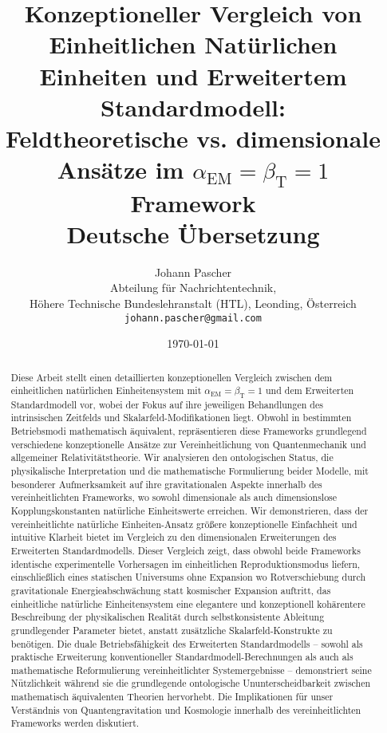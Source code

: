 \documentclass[12pt,a4paper]{article}
\newcommand{\alphaEM}{\alpha_{\text{EM}}}
\newcommand{\betaT}{\beta_{\text{T}}}
\begin{document}
	
	\title{{\Huge Konzeptioneller Vergleich von Einheitlichen Natürlichen Einheiten und Erweitertem Standardmodell:}\\
		{\LARGE Feldtheoretische vs. dimensionale Ansätze im $\alphaEM = \betaT = 1$ Framework}\\
		\vspace{1cm}
		{\large Deutsche Übersetzung}}
	
	\author{{\Large Johann Pascher}\\
		Abteilung für Nachrichtentechnik,\\
		Höhere Technische Bundeslehranstalt (HTL), Leonding, Österreich\\
		\texttt{johann.pascher@gmail.com}}
	
	\date{\today}
	
	\maketitle
	
	\begin{abstract}
		Diese Arbeit stellt einen detaillierten konzeptionellen Vergleich zwischen dem einheitlichen natürlichen Einheitensystem mit $\alphaEM = \betaT = 1$ und dem Erweiterten Standardmodell vor, wobei der Fokus auf ihre jeweiligen Behandlungen des intrinsischen Zeitfelds und Skalarfeld-Modifikationen liegt. Obwohl in bestimmten Betriebsmodi mathematisch äquivalent, repräsentieren diese Frameworks grundlegend verschiedene konzeptionelle Ansätze zur Vereinheitlichung von Quantenmechanik und allgemeiner Relativitätstheorie. Wir analysieren den ontologischen Status, die physikalische Interpretation und die mathematische Formulierung beider Modelle, mit besonderer Aufmerksamkeit auf ihre gravitationalen Aspekte innerhalb des vereinheitlichten Frameworks, wo sowohl dimensionale als auch dimensionslose Kopplungskonstanten natürliche Einheitswerte erreichen. Wir demonstrieren, dass der vereinheitlichte natürliche Einheiten-Ansatz größere konzeptionelle Einfachheit und intuitive Klarheit bietet im Vergleich zu den dimensionalen Erweiterungen des Erweiterten Standardmodells. Dieser Vergleich zeigt, dass obwohl beide Frameworks identische experimentelle Vorhersagen im einheitlichen Reproduktionsmodus liefern, einschließlich eines statischen Universums ohne Expansion wo Rotverschiebung durch gravitationale Energieabschwächung statt kosmischer Expansion auftritt, das einheitliche natürliche Einheitensystem eine elegantere und konzeptionell kohärentere Beschreibung der physikalischen Realität durch selbstkonsistente Ableitung grundlegender Parameter bietet, anstatt zusätzliche Skalarfeld-Konstrukte zu benötigen. Die duale Betriebsfähigkeit des Erweiterten Standardmodells – sowohl als praktische Erweiterung konventioneller Standardmodell-Berechnungen als auch als mathematische Reformulierung vereinheitlichter Systemergebnisse – demonstriert seine Nützlichkeit während sie die grundlegende ontologische Ununterscheidbarkeit zwischen mathematisch äquivalenten Theorien hervorhebt. Die Implikationen für unser Verständnis von Quantengravitation und Kosmologie innerhalb des vereinheitlichten Frameworks werden diskutiert.
	\end{abstract}
	\newpage
	\tableofcontents
	\newpage
	
\end{document}
